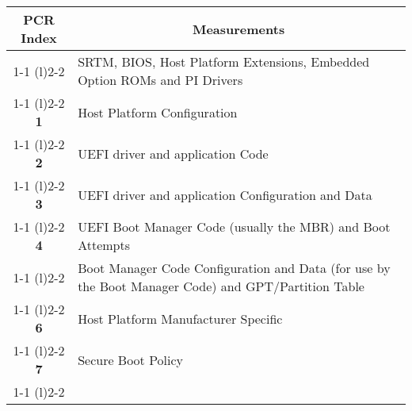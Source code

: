 \begin{table}[htb]
    \centering
    \begin{tabular}{cp{30em}}
        \toprule
        \multicolumn{1}{c}{{\bfseries \acs{PCR} Index}} & \multicolumn{1}{c}{{\bfseries Measurements}}                                                             \\
        \cmidrule[0.4pt](r){1-1}
        \cmidrule[0.4pt](l){2-2}
        \multirow{2}{*}{\textbf{0}}                     & SRTM, BIOS, Host Platform Extensions, Embedded Option ROMs and PI Drivers                                \\
        \cmidrule[0.4pt](r){1-1}
        \cmidrule[0.4pt](l){2-2}
        \textbf{1}                                      & Host Platform Configuration                                                                              \\
        \cmidrule[0.4pt](r){1-1}
        \cmidrule[0.4pt](l){2-2}
        \textbf{2}                                      & UEFI driver and application Code                                                                         \\
        \cmidrule[0.4pt](r){1-1}
        \cmidrule[0.4pt](l){2-2}
        \textbf{3}                                      & UEFI driver and application Configuration and Data                                                       \\
        \cmidrule[0.4pt](r){1-1}
        \cmidrule[0.4pt](l){2-2}
        \textbf{4}                                      & UEFI Boot Manager Code (usually the MBR) and Boot Attempts                                               \\
        \cmidrule[0.4pt](r){1-1}
        \cmidrule[0.4pt](l){2-2}
        \multirow{2}{*}{\textbf{5}}                     & Boot Manager Code Configuration and Data (for use by the Boot Manager Code) and \ac{GPT}/Partition Table \\
        \cmidrule[0.4pt](r){1-1}
        \cmidrule[0.4pt](l){2-2}
        \textbf{6}                                      & Host Platform Manufacturer Specific                                                                      \\
        \cmidrule[0.4pt](r){1-1}
        \cmidrule[0.4pt](l){2-2}
        \textbf{7}                                      & Secure Boot Policy                                                                                       \\
        \cmidrule[0.4pt](r){1-1}
        \cmidrule[0.4pt](l){2-2}

\end{tabular}
\end{table}
